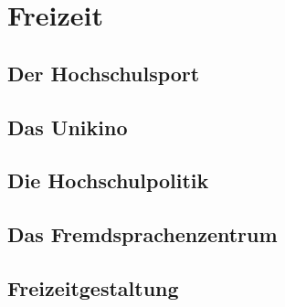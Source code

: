 \documentclass[12pt, a4paper]{article}
\newif\ifinfo
\begin{document}
\section{Freizeit}

\subsection{Der Hochschulsport}


\subsection{Das Unikino}


\subsection{Die Hochschulpolitik}



\subsection{Das Fremdsprachenzentrum}


\newpage
\subsection{Freizeitgestaltung}




%

%

\ifinfo
	\newpage
	\subsection{Sehenswürdigkeiten}
	
\fi
\end{document}
